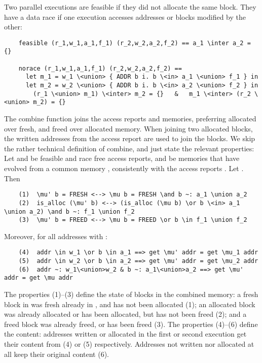 \documentclass[sn-mathphys,Numbered]{sn-jnl}
\theoremstyle{thmstyleone}%
\theoremstyle{definition}%
\theoremstyle{thmstylethree}%
\begin{document}
  Two parallel executions are feasible if they did not allocate the same block. They have a data race
  if one execution accesses addresses or blocks modified by the other:
  \begin{lstlisting}
    feasible (r_1,w_1,a_1,f_1) (r_2,w_2,a_2,f_2) == a_1 \inter a_2 = {}

    norace (r_1,w_1,a_1,f_1) (r_2,w_2,a_2,f_2) ==
      let m_1 = w_1 \<union> { ADDR b i. b \<in> a_1 \<union> f_1 } in
      let m_2 = w_2 \<union> { ADDR b i. b \<in> a_2 \<union> f_2 } in
        (r_1 \<union> m_1) \<inter> m_2 = {}   &   m_1 \<inter> (r_2 \<union> m_2) = {}
  \end{lstlisting}
  The combine function joins the access reports and memories,
  preferring allocated over fresh, and freed over allocated memory. When joining two allocated blocks, the written addresses
  from the access report are used to join the blocks. We skip the rather technical definition of combine, and just state the
  relevant properties: Let  and  be feasible and race free access reports,
  and  be memories that have evolved from a common memory \is{\mu}, consistently with
  the access reports . Let . Then
  \begin{lstlisting}
    (1)  \mu' b = FRESH <--> \mu b = FRESH \and b ~: a_1 \union a_2
    (2)  is_alloc (\mu' b) <--> (is_alloc (\mu b) \or b \<in> a_1 \union a_2) \and b ~: f_1 \union f_2
    (3)  \mu' b = FREED <--> \mu b = FREED \or b \in f_1 \union f_2
  \end{lstlisting}
  Moreover, for all addresses  with :
  \begin{lstlisting}
    (4)  addr \in w_1 \or b \in a_1 ==> get \mu' addr = get \mu_1 addr
    (5)  addr \in w_2 \or b \in a_2 ==> get \mu' addr = get \mu_2 addr
    (6)  addr ~: w_1\<union>w_2 & b ~: a_1\<union>a_2 ==> get \mu' addr = get \mu addr
  \end{lstlisting}
  The properties (1)--(3) define the state of blocks in the combined memory:
  a fresh block in  was fresh already in \is{\mu}, and has not been allocated (1);
  an allocated block was already allocated or has been allocated, but has not been freed (2); and a freed block was already freed, or has been freed (3).
  The properties (4)--(6) define the content: addresses written or allocated in the first or second execution get their content from  (4) or  (5) respectively.
  Addresses not written nor allocated at all keep their original content (6).
\end{document}
